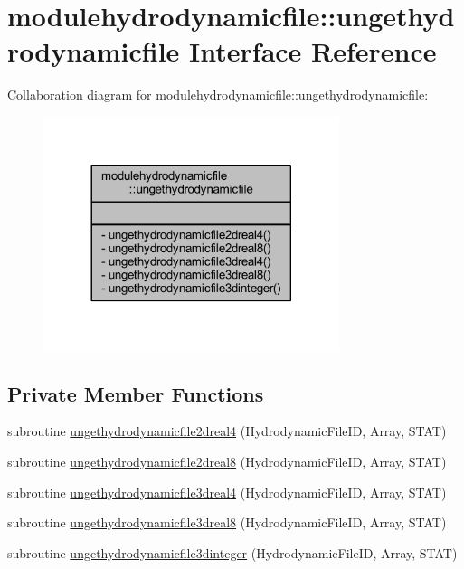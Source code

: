 \hypertarget{interfacemodulehydrodynamicfile_1_1ungethydrodynamicfile}{}\section{modulehydrodynamicfile\+:\+:ungethydrodynamicfile Interface Reference}
\label{interfacemodulehydrodynamicfile_1_1ungethydrodynamicfile}


Collaboration diagram for modulehydrodynamicfile\+:\+:ungethydrodynamicfile\+:\nopagebreak
\begin{figure}[H]
\begin{center}
\leavevmode
\includegraphics[width=245pt]{interfacemodulehydrodynamicfile_1_1ungethydrodynamicfile__coll__graph}
\end{center}
\end{figure}
\subsection*{Private Member Functions}
\begin{DoxyCompactItemize}
\item 
subroutine \mbox{\hyperlink{interfacemodulehydrodynamicfile_1_1ungethydrodynamicfile_a8d2ea676f5a9857c8ffba15c38e8029f}{ungethydrodynamicfile2dreal4}} (Hydrodynamic\+File\+ID, Array, S\+T\+AT)
\item 
subroutine \mbox{\hyperlink{interfacemodulehydrodynamicfile_1_1ungethydrodynamicfile_a3dafb8963258ad362bbf750c3fecf25f}{ungethydrodynamicfile2dreal8}} (Hydrodynamic\+File\+ID, Array, S\+T\+AT)
\item 
subroutine \mbox{\hyperlink{interfacemodulehydrodynamicfile_1_1ungethydrodynamicfile_a31e5ca7a14482648d2729fb05175915a}{ungethydrodynamicfile3dreal4}} (Hydrodynamic\+File\+ID, Array, S\+T\+AT)
\item 
subroutine \mbox{\hyperlink{interfacemodulehydrodynamicfile_1_1ungethydrodynamicfile_a6014067558e4b44811e0e61d402f12e0}{ungethydrodynamicfile3dreal8}} (Hydrodynamic\+File\+ID, Array, S\+T\+AT)
\item 
subroutine \mbox{\hyperlink{interfacemodulehydrodynamicfile_1_1ungethydrodynamicfile_a81484204c313b36c3ba0567a84058166}{ungethydrodynamicfile3dinteger}} (Hydrodynamic\+File\+ID, Array, S\+T\+AT)
\end{DoxyCompactItemize}


